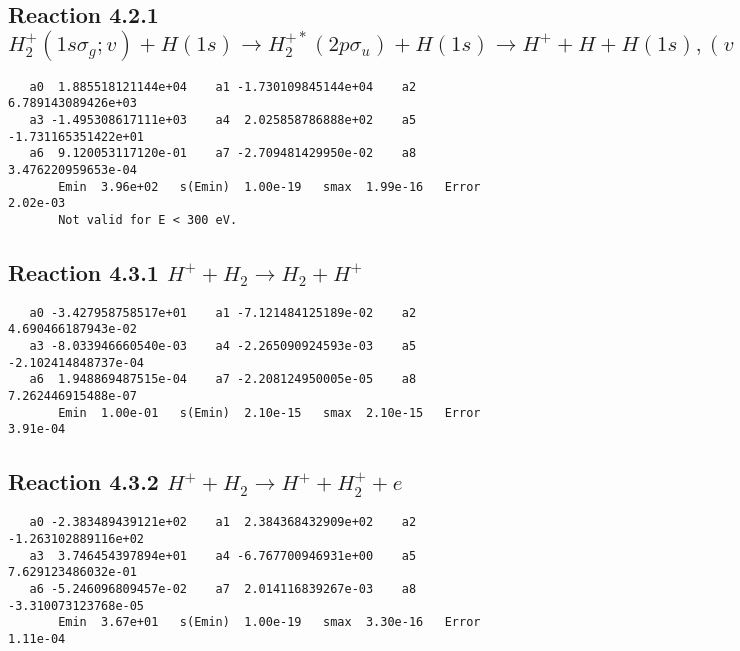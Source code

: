 \documentclass[12pt]{article}
\begin{document}
\newpage
\subsection{
Reaction 4.2.1 $H_2^+(1s\sigma_g;v) + H(1s) \rightarrow H_2^{+*}(2p\sigma_u) + H(1s) \rightarrow H^+ + H + H(1s), (v=0\ldots 9)$}












\begin{small}\begin{verbatim}
   a0  1.885518121144e+04    a1 -1.730109845144e+04    a2  6.789143089426e+03
   a3 -1.495308617111e+03    a4  2.025858786888e+02    a5 -1.731165351422e+01
   a6  9.120053117120e-01    a7 -2.709481429950e-02    a8  3.476220959653e-04
       Emin  3.96e+02   s(Emin)  1.00e-19   smax  1.99e-16   Error  2.02e-03
       Not valid for E < 300 eV.
\end{verbatim}\end{small}

\newpage
\subsection{
Reaction 4.3.1 $   H^+ + H_2 \rightarrow H_2 + H^+$}


\begin{small}\begin{verbatim}
   a0 -3.427958758517e+01    a1 -7.121484125189e-02    a2  4.690466187943e-02
   a3 -8.033946660540e-03    a4 -2.265090924593e-03    a5 -2.102414848737e-04
   a6  1.948869487515e-04    a7 -2.208124950005e-05    a8  7.262446915488e-07
       Emin  1.00e-01   s(Emin)  2.10e-15   smax  2.10e-15   Error  3.91e-04
\end{verbatim}\end{small}

\newpage
\subsection{
Reaction 4.3.2 $   H^+ + H_2 \rightarrow H^+ + H_2^+ + e$}


\begin{small}\begin{verbatim}
   a0 -2.383489439121e+02    a1  2.384368432909e+02    a2 -1.263102889116e+02
   a3  3.746454397894e+01    a4 -6.767700946931e+00    a5  7.629123486032e-01
   a6 -5.246096809457e-02    a7  2.014116839267e-03    a8 -3.310073123768e-05
       Emin  3.67e+01   s(Emin)  1.00e-19   smax  3.30e-16   Error 1.11e-04
\end{verbatim}\end{small}
\end{document}
